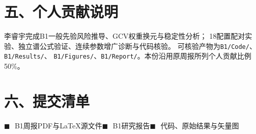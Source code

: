 \documentclass[UTF8,fontset=fandol,11pt,a4paper]{ctexart}
\newcommand{\bbox}{\(\blacksquare\)\,}
\begin{document}
\section*{五、个人贡献说明}
李睿宇完成B1一般先验风险推导、GCV权重换元与稳定性分析；
18配置配对实验、独立谱公式验证、连续参数增广诊断与代码核验。
可核验产物为\nolinkurl{B1/Code/}、\nolinkurl{B1/Results/}、
\nolinkurl{B1/Figures/}、\nolinkurl{B1/Report/}。本份沿用原周报所列个人贡献比例50\%。

\section*{六、提交清单}
\bbox\ B1周报PDF与\LaTeX{}源文件\quad \bbox\ B1研究报告\quad \bbox\ 代码、原始结果与矢量图\par
\end{document}
